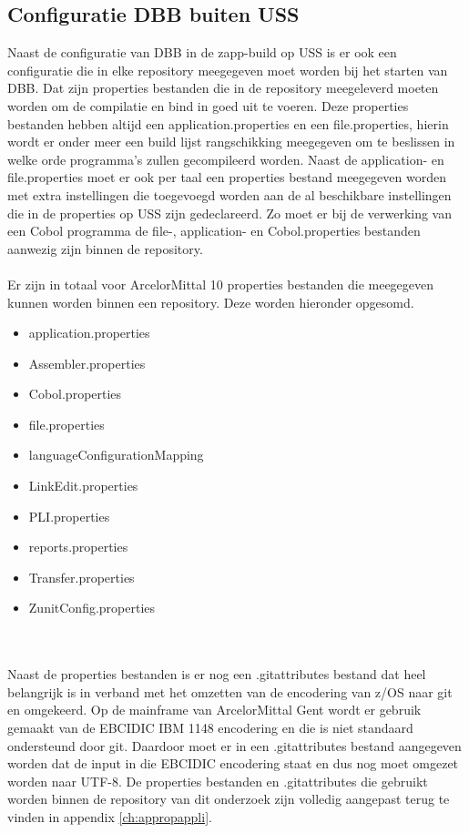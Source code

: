 \subsection{Configuratie DBB buiten USS}
Naast de configuratie van DBB in de zapp-build op USS is er ook een configuratie die in elke repository meegegeven moet worden bij het starten van DBB. Dat zijn properties bestanden die in de repository meegeleverd moeten worden om de compilatie en bind in goed uit te voeren. Deze properties bestanden hebben altijd een application.properties en een file.properties, hierin wordt er onder meer een build lijst rangschikking meegegeven om te beslissen in welke orde programma's zullen gecompileerd worden. Naast de application- en file.properties moet er ook per taal een properties bestand meegegeven worden met extra instellingen die toegevoegd worden aan de al beschikbare instellingen die in de properties op USS zijn gedeclareerd. Zo moet er bij de verwerking van een Cobol programma de file-, application- en Cobol.properties bestanden aanwezig zijn binnen de repository. 
\\ \\
Er zijn in totaal voor ArcelorMittal 10 properties bestanden die meegegeven kunnen worden binnen een repository. Deze worden hieronder opgesomd.
\begin{multicols}{2}
    \begin{itemize}
        \item application.properties
        \item Assembler.properties
        \item Cobol.properties
        \item file.properties
        \item languageConfigurationMapping
        \item LinkEdit.properties
        \item PLI.properties
        \item reports.properties
        \item Transfer.properties
        \item ZunitConfig.properties
    \end{itemize}
\end{multicols}
\\ \\
Naast de properties bestanden is er nog een .gitattributes bestand dat heel belangrijk is in verband met het omzetten van de encodering van z/OS naar git en omgekeerd. Op de mainframe van ArcelorMittal Gent wordt er gebruik gemaakt van de EBCIDIC IBM 1148 encodering en die is niet standaard ondersteund door git. Daardoor moet er in een .gitattributes bestand aangegeven worden dat de input in die EBCIDIC encodering staat en dus nog moet omgezet worden naar UTF-8. De properties bestanden en .gitattributes die gebruikt worden binnen de repository van dit onderzoek zijn volledig aangepast terug te vinden in appendix \ref{ch:appropappli}. 

